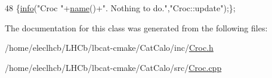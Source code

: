 \begin{DoxyCode}
48 \{\hyperlink{classObject_a644fd329ea4cb85f54fa6846484b84a8}{info}(\textcolor{stringliteral}{"Croc "}+\hyperlink{classObject_a300f4c05dd468c7bb8b3c968868443c1}{name}()+\textcolor{stringliteral}{". Nothing to do."},\textcolor{stringliteral}{"Croc::update"});\};
\end{DoxyCode}


The documentation for this class was generated from the following files\+:\begin{DoxyCompactItemize}
\item 
/home/eleclhcb/\+L\+H\+Cb/lbcat-\/cmake/\+Cat\+Calo/inc/\hyperlink{Croc_8h}{Croc.\+h}\item 
/home/eleclhcb/\+L\+H\+Cb/lbcat-\/cmake/\+Cat\+Calo/src/\hyperlink{Croc_8cpp}{Croc.\+cpp}\end{DoxyCompactItemize}
